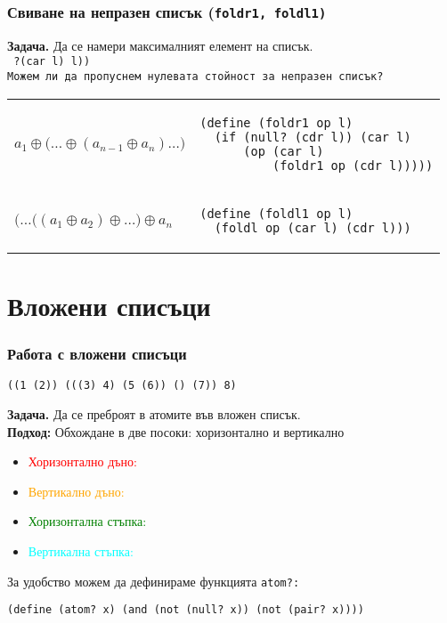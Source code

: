 \documentclass{beamer}
\begin{document}
\begin{frame}[fragile]
  \frametitle{Свиване на непразен списък (\tt{foldr1, foldl1})}

  \textbf{Задача.} Да се намери максималният елемент на списък.\\
  \pause
  \tt{ ?{(car l)} l))}\\[1em]
  \pause\pause
  Можем ли да пропуснем нулевата стойност за непразен списък?\\[1em]
  \begin{tabular}{ll}
    \pause
      $a_1 \oplus \big(\ldots \oplus (a_{n-1} \oplus a_n) \ldots\big)$
    & \pause
\begin{lstlisting}
(define (foldr1 op l)
  (if (null? (cdr l)) (car l)
      (op (car l)
          (foldr1 op (cdr l)))))
\end{lstlisting}\\[3em]
    \pause
    $\big(\ldots\big((a_1 \oplus a_2) \oplus \ldots\big) \oplus a_n$
    & \pause
\begin{lstlisting}
(define (foldl1 op l)
  (foldl op (car l) (cdr l)))
\end{lstlisting}
  \end{tabular}
\end{frame}

\section{Вложени списъци}

\newcommand{\hzero}{\textcolor{red}}
\newcommand{\vzero}{\textcolor{orange}}
\newcommand{\hstep}{\textcolor{green}}
\newcommand{\vstep}{\textcolor{cyan}}

\begin{frame}[fragile]
  \frametitle{Работа с вложени списъци}

\begin{verbatim}
((1 (2)) (((3) 4) (5 (6)) () (7)) 8)
\end{verbatim}
  \textbf{Задача.} Да се преброят в атомите във вложен списък.\\
  \textbf{Подход:} Обхождане в две посоки: хоризонтално и вертикално
  \pause
  \begin{itemize}[<+->]
  \item \hzero{Хоризонтално дъно:} 
  \item \vzero{Вертикално дъно:} 
  \item \hstep{Хоризонтална стъпка:} 
  \item \vstep{Вертикална стъпка:} 
  \end{itemize}
  \vspace{1em}
  \onslide<+->
  За удобство можем да дефинираме функцията \tt{atom?}:
\begin{lstlisting}
(define (atom? x) (and (not (null? x)) (not (pair? x))))
\end{lstlisting}
\end{frame}
\end{document}
